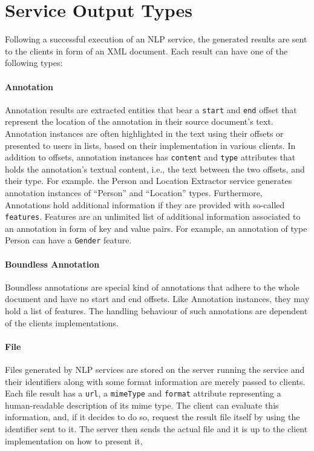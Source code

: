 \section{Service Output Types}
Following a successful execution of an NLP service, the generated results are sent to the clients in form of an XML document. Each result can have one of the following types:

\paragraph{Annotation} Annotation results are extracted entities that bear a \texttt{start} and \texttt{end} offset that represent the location of the annotation in their source document's text. Annotation instances are often highlighted in the text using their offsets or presented to users in lists, based on their implementation in various clients. In addition to offsets, annotation instances has \texttt{content} and \texttt{type} attributes that holds the annotation's textual content, i.e., the text between the two offsets, and their type. For example. the Person and Location Extractor service generates annotation instances of ``Person'' and ``Location'' types. Furthermore, Annotations hold additional information if they are provided with so-called \texttt{features}. Features are an unlimited list of additional information associated to an annotation in form of key and value pairs. For example, an annotation of type Person can have a \texttt{Gender} feature.
\paragraph{Boundless Annotation} Boundless annotations are special kind of annotations that adhere to the whole document and have no start and end offsets. Like Annotation instances, they may hold a list of features. The handling behaviour of such annotations are dependent of the clients implementations.  
\paragraph{File} Files generated by NLP services are stored on the server running the service and their identifiers along with some format information are merely passed to clients. Each file result has a \texttt{url}, a \texttt{mimeType} and \texttt{format} attribute representing a human-readable description of its mime type. The client can evaluate this information, and, if it decides to do so, request the result  file itself by using the identiﬁer sent to it. The server then sends the actual file and it is up to the client implementation on how to present it,

